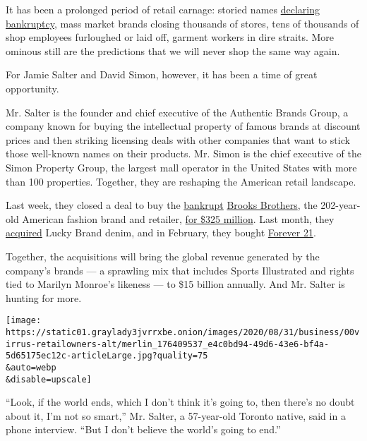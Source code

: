 It has been a prolonged period of retail carnage: storied names
\href{https://www.nytimes3xbfgragh.onion/2020/04/21/business/coronavirus-department-stores-neiman-marcus.html}{declaring
bankruptcy}, mass market brands closing thousands of stores, tens of
thousands of shop employees furloughed or laid off, garment workers in
dire straits. More ominous still are the predictions that we will never
shop the same way again.

For Jamie Salter and David Simon, however, it has been a time of great
opportunity.

Mr. Salter is the founder and chief executive of the Authentic Brands
Group, a company known for buying the intellectual property of famous
brands at discount prices and then striking licensing deals with other
companies that want to stick those well-known names on their products.
Mr. Simon is the chief executive of the Simon Property Group, the
largest mall operator in the United States with more than 100
properties. Together, they are reshaping the American retail landscape.

Last week, they closed a deal to buy the
\href{https://www.nytimes3xbfgragh.onion/2020/08/12/business/brooks-brothers-sale-authentic-brands.html?searchResultPosition=1}{bankrupt}
\href{https://www.nytimes3xbfgragh.onion/2020/07/08/business/brooks-brothers-chapter-11-bankruptcy.html?searchResultPosition=3}{Brooks
Brothers}, the 202-year-old American fashion brand and retailer,
\href{https://www.nytimes3xbfgragh.onion/2020/08/12/business/brooks-brothers-sale-authentic-brands.html}{for
\$325 million}. Last month, they
\href{https://abgnewsroom.com/home/authentic-brands-group-and-sparc-group-to-acquire-lucky-brand}{acquired}
Lucky Brand denim, and in February, they bought
\href{https://www.nytimes3xbfgragh.onion/2019/10/23/business/forever-21-bankruptcy-chang-family.html?searchResultPosition=8}{Forever
21}.

Together, the acquisitions will bring the global revenue generated by
the company's brands --- a sprawling mix that includes Sports
Illustrated and rights tied to Marilyn Monroe's likeness --- to \$15
billion annually. And Mr. Salter is hunting for more.

\texttt{[image: https://static01.graylady3jvrrxbe.onion/images/2020/08/31/business/00virrus-retailowners-alt/merlin\_176409537\_e4c0bd94-49d6-43e6-bf4a-5d65175ec12c-articleLarge.jpg?quality=75\\\&auto=webp\\\&disable=upscale]}

``Look, if the world ends, which I don't think it's going to, then
there's no doubt about it, I'm not so smart,'' Mr. Salter, a 57-year-old
Toronto native, said in a phone interview. ``But I don't believe the
world's going to end.''

